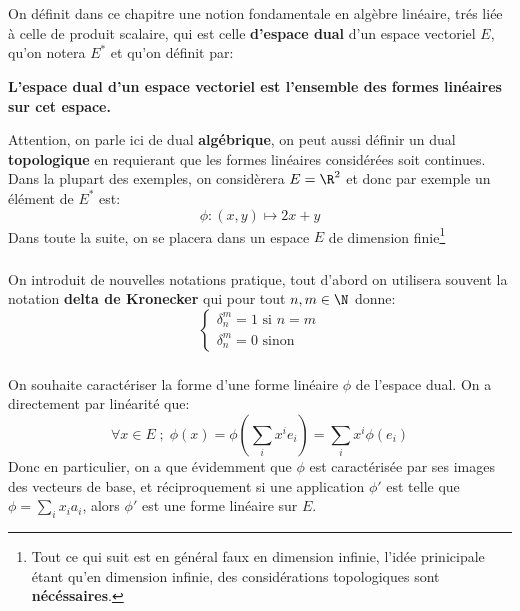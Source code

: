 \chapter*{}
On définit dans ce chapitre une notion fondamentale en algèbre linéaire, trés liée à celle de produit scalaire, qui est celle \textbf{d'espace dual} d'un espace vectoriel \(E\), qu'on notera \(E^*\) et qu'on définit par:
\begin{center}
   \textbf{L'espace dual d'un espace vectoriel est l'ensemble des formes linéaires sur cet espace.}
\end{center}
Attention, on parle ici de dual \textbf{algébrique}, on peut aussi définir un dual \textbf{topologique} en requierant que les formes linéaires considérées soit continues. Dans la plupart des exemples, on considèrera \(E = \R^2\) et donc par exemple un élément de \(E^*\) est:
\[
   \phi : (x, y) \mapsto 2x + y   
\]
Dans toute la suite, on se placera dans un espace \(E\) de dimension finie\footnote[1]{Tout ce qui suit est en général faux en dimension infinie, l'idée prinicipale étant qu'en dimension infinie, des considérations topologiques sont \textbf{nécéssaires}.}

\subsection*{}
On introduit de nouvelles notations pratique, tout d'abord on utilisera souvent la notation \textbf{delta de Kronecker} qui pour tout \(n, m \in \N\) donne:
\[
   \begin{cases}
      \delta_{n}^m = 1 \text{ si } n = m\\
      \delta_{n}^m = 0 \text{ sinon }
   \end{cases}
\]

\subsection*{}
On souhaite caractériser la forme d'une forme linéaire \(\phi\) de l'espace dual. On a directement par linéarité que:
\[
   \forall x \in E \; ; \; \phi(x) = \phi\left(\sum_{i}x^ie_i\right) = \sum_{i}x^i\phi(e_i)  
\]
Donc en particulier, on a que évidemment que \(\phi\) est caractérisée par ses images des vecteurs de base, et réciproquement si une application \(\phi'\) est telle que \(\phi = \sum_{i}x_ia_i\), alors \(\phi'\) est une forme linéaire sur \(E\).

